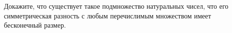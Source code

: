 Докажите, что существует такое подмножество натуральных чисел, что его симметрическая разность с любым
перечислимым множеством имеет бесконечный размер.
